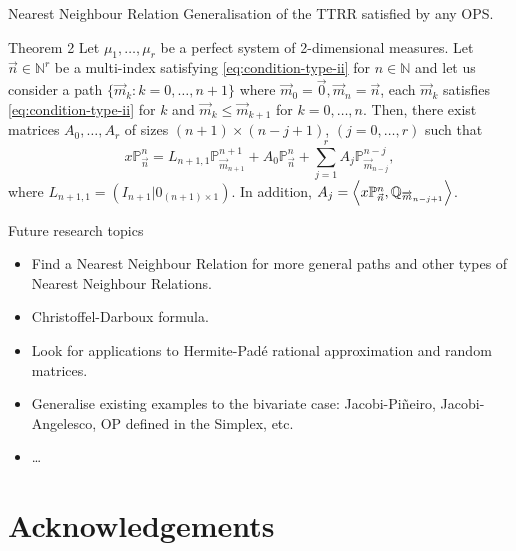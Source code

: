 \documentclass[compress,aspectratio=169]{beamer}
\newcommand{\N}[0]{\mathbb{N}}
\newcommand{\prodesc}[2]{\left\langle #1 , #2 \right\rangle}
\begin{document}
  \begin{frame}{Nearest Neighbour Relation}
	Generalisation of the TTRR satisfied by any OPS.
\begin{block}{Theorem 2}
	Let $\mu_1,\dots,\mu_r$ be a perfect system of 2-dimensional measures. Let $\vec n\in \N^r$ be a multi-index satisfying \eqref{eq:condition-type-ii} for $n\in\N$ and let us consider a path $\{\overrightarrow{m}_k:k=0,\dots,n+1\}$ where $\overrightarrow{m}_0=\vec 0, \overrightarrow{m}_n = \vec n$, each $\overrightarrow{m}_k$ satisfies \eqref{eq:condition-type-ii} for $k$ and $\overrightarrow{m}_k \leq \overrightarrow m_{k+1}$ for $k=0,\dots,n$. Then, there exist matrices $A_0,\dots,A_r$ of sizes $(n+1)\times(n-j+1)$,  $(j=0,\dots,r)$ such that
	\begin{equation}
		\label{eq:nearest-neighbour}
		x\mathbb P_{\vec n}^n = L_{{n+1},1} \mathbb P_{\overrightarrow{m}_{n+1}}^{n+1} + A_0 \mathbb P_{\vec n}^n + \sum_{j=1}^r A_j \mathbb P_{\overrightarrow{m}_{n-j}}^{n-j},
	\end{equation}
	where $L_{n+1,1}=(I_{n+1}|0_{(n+1)\times 1})$. In addition, $A_j =\nolinebreak \prodesc{x\mathbb P_{\vec n}^n}{\mathbb Q_{\overrightarrow{m}_{n-j+1}}}$.
\end{block}
  \end{frame}

  \begin{frame}{Future research topics}
	\begin{itemize}
		\item Find a Nearest Neighbour Relation for more general paths and other types of Nearest Neighbour Relations.
		\item Christoffel-Darboux formula.
		\item Look for applications to Hermite-Padé rational approximation and random matrices.
		\item Generalise existing examples to the bivariate case: Jacobi-Piñeiro, Jacobi-Angelesco, OP defined in the Simplex, etc.
		\item \dots
	  \end{itemize}
  \end{frame}

\section*{Acknowledgements}
\end{document}
